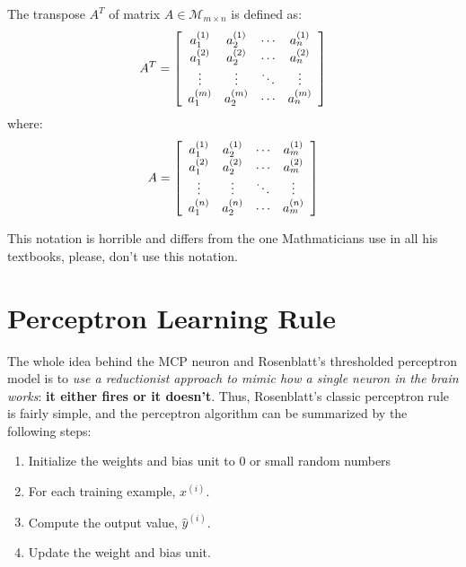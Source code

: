\documentclass[../machine_learning_scikit.tex]{subfiles}
\begin{document}
    \begin{obs}
        The transpose $A^T$ of matrix $A\in\mathcal{M}_{m\times n}$ is defined as:
        \begin{equation*}
            A^T=\left[
                \begin{array}{c c c c}
                    a_1^{(1)} & a_2^{(1)} & \cdots & a_n^{(1)} \\
                    a_1^{(2)} & a_2^{(2)} & \cdots & a_n^{(2)} \\
                    \vdots & \vdots & \ddots & \vdots \\
                    a_1^{(m)} & a_2^{(m)} & \cdots & a_n^{(m)} \\
                \end{array}
            \right]
        \end{equation*}
        where:
        \begin{equation*}
            A=\left[
                \begin{array}{c c c c}
                    a_1^{(1)} & a_2^{(1)} & \cdots & a_m^{(1)} \\
                    a_1^{(2)} & a_2^{(2)} & \cdots & a_m^{(2)} \\
                    \vdots & \vdots & \ddots & \vdots \\
                    a_1^{(n)} & a_2^{(n)} & \cdots & a_m^{(n)} \\
                \end{array}
            \right]
        \end{equation*}
    \end{obs}

    \begin{obs}
        This notation is horrible and differs from the one Mathmaticians use in all his textbooks, please, don't use this notation.
    \end{obs}

    \section{Perceptron Learning Rule}

    The whole idea behind the MCP neuron and Rosenblatt's thresholded perceptron model is to \textit{use a reductionist approach to mimic how a single neuron in the brain works}: \textbf{it either fires or it doesn't}. Thus, Rosenblatt's classic perceptron rule is fairly simple, and the perceptron algorithm can be summarized by the following steps:
    \begin{enumerate}
        \item Initialize the weights and bias unit to $0$ or small random numbers
        \item For each training example, $x^{(i)}$.
        \item Compute the output value, $\hat{y}^{(i)}$.
        \item Update the weight and bias unit.
    \end{enumerate}
\end{document}
